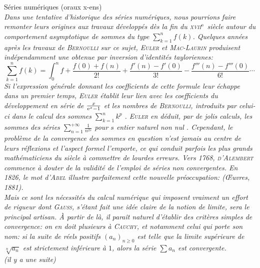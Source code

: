 Séries numériques (oraux x-ens)\\
\textsl{
Dans une tentative d'historique des séries numériques, nous pourrions faire remonter leurs origines aux travaux développés dès la fin du \textsc{xvii}$^{\mathrm{e}}$ siècle autour du comportement asymptotique de sommes du type $\sum\limits_{k=1}^n f(k)$. Quelques années après les travaux de \textsc{Bernoulli} sur ce sujet, \textsc{Euler} et \textsc{Mac-Laurin} produisent indépendamment une  obtenue par inversion d'identités tayloriennes:
$$\sum_{k=1}^n f(k) = \int_0^n f + \frac{f(0) + f(n)}{2!} + \frac{f'(n) - f'(0)}{3!} - \frac{f'''(n) - f'''(0)}{6!}\cdots$$
Si l'expression générale donnant les coefficients de cette formule leur échappe dans un premier temps, \textsc{Euler} établit leur lien avec les coefficients du développement en série de $\frac{x}{\mathrm{e}^x-1}$ et les nombres de \textsc{Bernoulli}, introduits par celui-ci dans le calcul des sommes $\sum\limits_{k=1}^n k^p$ \note. \textsc{Euler} en déduit, par de jolis calculs, les sommes des séries $\sum\limits_{n=1}^{+\infty} \frac{1}{n^{2s}}$ pour $s$ entier naturel non nul \note.
Cependant, le problème de la convergence des sommes en question n'est jamais au centre de leurs réflexions et l'aspect formel l'emporte, ce qui conduit parfois les plus grands mathématiciens du siècle à commettre de lourdes erreurs. Vers 1768, \textsc{d'Alembert} commence à douter de la validité de l'emploi de séries non convergentes. En 1826, le mot d'\textsc{Abel} illustre parfaitement cette nouvelle préoccupation:  (Œuvres, 1881). \\
Mais ce sont les nécessités du calcul numérique qui imposent vraiment un effort de rigueur dont \textsc{Gauss}, s'étant fait une idée claire de la notion de limite, sera le principal artisan. À partir de là, il paraît naturel d'établir des critères simples de convergence: on en doit plusieurs à \textsc{Cauchy}, et notamment celui qui porte son nom: si la suite de réels positifs $(a_n)_{n \geqslant 0}$ est telle que la limite supérieure de $\sqrt[n]{a_n}$ est strictement inférieure à $1$, alors la série $\sum a_n$ est convergente. \\
(il y a une suite)
}
